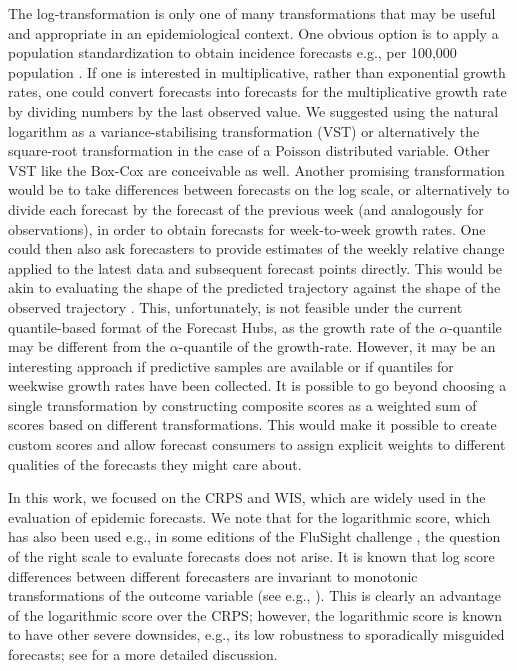 \documentclass{article}
\begin{document}
The log-transformation is only one of many transformations that may be useful and appropriate in an epidemiological context. One obvious option is to apply a population standardization to obtain incidence forecasts e.g., per 100,000 population \citep{abbottEvaluatingEpidemiologicallyMotivated2022}. If one is interested in multiplicative, rather than exponential growth rates, one could convert forecasts into forecasts for the multiplicative growth rate by dividing numbers by the last observed value. We suggested using the natural logarithm as a variance-stabilising transformation (VST) or alternatively the square-root transformation in the case of a Poisson distributed variable. Other VST like the Box-Cox \citep{boxAnalysisTransformations1964} are conceivable as well. Another promising transformation would be to take differences between forecasts on the log scale, or alternatively to divide each forecast by the forecast of the previous week (and analogously for observations), in order to obtain forecasts for week-to-week growth rates. One could then also ask forecasters to provide estimates of the weekly relative change applied to the latest data and subsequent forecast points directly. This would be akin to evaluating the shape of the predicted trajectory against the shape of the observed trajectory \citep[for a different approach to evaluating the shape of a forecast, see][]{srivastavaShapebasedEvaluationEpidemic2022}. This, unfortunately, is not feasible under the current quantile-based format of the Forecast Hubs, as the growth rate of the $\alpha$-quantile may be different from the $\alpha$-quantile of the growth-rate. However, it may be an interesting approach if predictive samples are available or if quantiles for weekwise growth rates have been collected. It is possible to go beyond choosing a single transformation by constructing composite scores as a weighted sum of scores based on different transformations. This would make it possible to create custom scores and allow forecast consumers to assign explicit weights to different qualities of the forecasts they might care about.

In this work, we focused on the CRPS and WIS, which are widely used in the evaluation of epidemic forecasts. We note that for the logarithmic score, which has also been used e.g., in some editions of the FluSight challenge \cite{reichCollaborativeMultiyearMultimodel2019}, the question of the right scale to evaluate forecasts does not arise. It is known that log score differences between different forecasters are invariant to monotonic transformations of the outcome variable (see e.g., \citealt{diksLikelihoodbasedScoringRules2011}). This is clearly an advantage of the logarithmic score over the CRPS; however, the logarithmic score is known to have other severe downsides, e.g., its low robustness to sporadically misguided forecasts; see \cite{bracherEvaluatingEpidemicForecasts2021} for a more detailed discussion.
\end{document}
